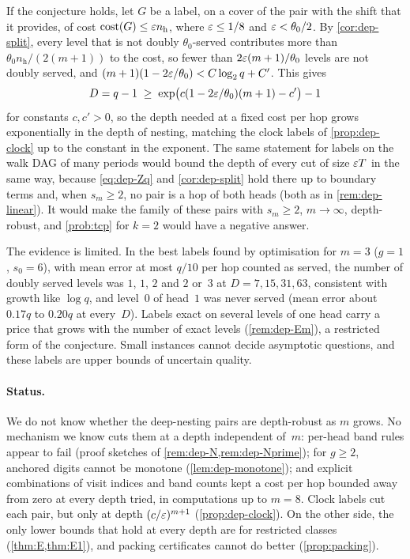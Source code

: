 If the conjecture holds, let $G$ be a label, on a cover of the pair with the shift that it provides, of cost
$\mathrm{cost}(G)\le\varepsilon n_{\mathrm h}$, where $\varepsilon\le1/8$ and
$\varepsilon<\theta_0/2$. By \cref{cor:dep-split}, every level that is not doubly $\theta_0$-served contributes more than
$\theta_0n_{\mathrm h}/(2(m+1))$ to the cost, so fewer than $2\varepsilon(m+1)/\theta_0$ levels are not doubly served, and
$(m+1)(1-2\varepsilon/\theta_0)<C\log_2q+C'$. This gives
\[
  D=q-1\;\ge\;\exp\bigl(c(1-2\varepsilon/\theta_0)(m+1)-c'\bigr)-1
\]
for constants $c,c'>0$, so the depth needed at a fixed cost per hop grows exponentially in the depth of nesting,
matching the clock labels of \cref{prop:dep-clock} up to the constant in the exponent. The same statement for labels
on the walk DAG of many periods would bound the depth of every cut of size $\varepsilon T$ in the same way, because
\eqref{eq:dep-Zq} and \cref{cor:dep-split} hold there up to boundary terms and, when $s_m\ge2$, no pair is a hop of
both heads (both as in \cref{rem:dep-linear}). It would make the family of these pairs with $s_m\ge2$, $m\to\infty$,
depth-robust, and \cref{prob:tcp} for $k=2$ would have a negative answer.

\begin{remark}\label{rem:dep-Aevidence}
The evidence is limited. In the best labels found by optimisation for $m=3$ ($g=1$, $s_0=6$), with mean error at most
$q/10$ per hop counted as served, the number of doubly served levels was $1$, $1$, $2$ and $2$ or~$3$ at
$D=7,15,31,63$, consistent with growth like $\log q$, and level~$0$ of head~$1$ was never served (mean error about
$0.17q$ to $0.20q$ at every~$D$). Labels exact on several levels of one head carry a price that grows with the number
of exact levels (\cref{rem:dep-Em}), a restricted form of the conjecture. Small instances cannot decide asymptotic
questions, and these labels are upper bounds of uncertain quality.
\end{remark}

\paragraph{Status.} We do not know whether the deep-nesting pairs are depth-robust as $m$ grows. No mechanism we know
cuts them at a depth independent of~$m$: per-head band rules appear to fail (proof sketches of \cref{rem:dep-N,rem:dep-Nprime}); for $g\ge2$, anchored digits
cannot be monotone (\cref{lem:dep-monotone}); and explicit combinations of visit indices and band counts kept a cost per
hop bounded away from zero at every depth tried, in computations up to $m=8$. Clock labels cut each pair, but only at depth $(c/\varepsilon)^{m+1}$ (\cref{prop:dep-clock}). On the other
side, the only lower bounds that hold at every depth are for restricted classes
(\cref{thm:E,thm:E1}), and packing certificates cannot do better (\cref{prop:packing}).

